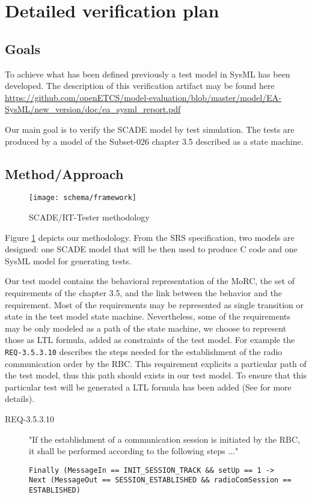 \section{Detailed verification plan}

\subsection{Goals}

To achieve what has been defined previously a test model in SysML has
been developed. The description of this verification artifact may be
found here \url{https://github.com/openETCS/model-evaluation/blob/master/model/EA-SysML/new_version/doc/ea_sysml_report.pdf}

Our main goal is to verify the SCADE model by test simulation. The
tests are produced by a model of the Subset-026 chapter 3.5 described as a
state machine.

\subsection{Method/Approach}

\begin{figure}
\texttt{[image: schema/framework]}
\caption{\label{fig:method}SCADE/RT-Tester methodology}
\end{figure}

Figure \ref{fig:method} depicts our methodology. From the SRS
specification, two models are designed: one SCADE model that will
be then  used to produce C code and one SysML model for generating
tests.

Our test model contains the behavioral representation of the MoRC, the
set of requirements of the chapter 3.5, and the link between the behavior
and the requirement.  Most of the requirements may be represented as
single transition or state in the test model state
machine. Nevertheless, some of the requirements may be only modeled as
a path of the state machine, we choose to represent those as LTL
formula, added as constraints of the test model. For example the
\verb+REQ-3.5.3.10+ describes the steps needed for the establishment of
the radio communication order by the RBC. This requirement explicits a
particular path of the test model, thus this path should exists in our
test model. To ensure that this particular test will be generated a LTL
formula has been added (See \cite{braunstein_MorC_2013} for more
details).

\begin{description}
\item[REQ-3.5.3.10] "If the establishment of a communication session is
initiated by the RBC, it shall be performed according to the following steps
..."
\vspace{-1em}
\begin{verbatim}
Finally (MessageIn == INIT_SESSION_TRACK && setUp == 1 -> 
Next (MessageOut == SESSION_ESTABLISHED && radioComSession == ESTABLISHED)
\end{verbatim}
\end{description}

